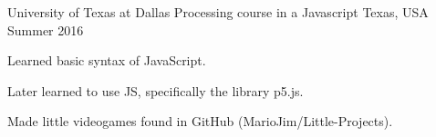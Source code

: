 \begin{cventries}
  \cventry
    {University of Texas at Dallas} %
    {Processing course in a Javascript} %
    {Texas, USA} %
    {Summer 2016} %
    {
      \begin{cvitems} %
        \item {Learned basic syntax of JavaScript.}
        \item {Later learned to use JS, specifically the library p5.js.}
        \item {Made little videogames found in GitHub (MarioJim/Little-Projects).}
      \end{cvitems}
    }

\end{cventries}

